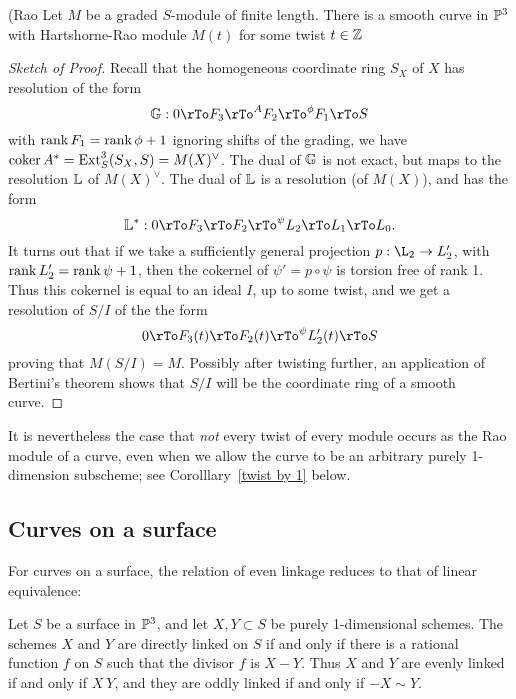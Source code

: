 \begin{theorem}(Rao\cite{***}
Let $M$ be a graded $S$-module of finite length. There is a smooth curve in $\PP^3$ with Hartshorne-Rao module $M(t)$ for some twist $t\in \ZZ$
\end{theorem}
\begin{proof}[Sketch of Proof] 
Recall that the homogeneous coordinate
ring $S_X$ of $X$ has resolution of the form
$$
\GG: 0\rTo F_3\rTo^A F_2\rTo^\phi F_1\rTo S
$$
with $\rank F_1 = \rank \phi+1$
ignoring shifts of the grading, we have $\coker A^* = \Ext^3_S(S_X,S)  = M(X)^\vee$. The dual of $\GG$ is not exact, but maps to the 
resolution $\LL$ of $M(X)^\vee$. The dual of $\LL$ is a resolution (of $M(X)$), and has the form
$$
\LL^*: 0\rTo F_3 \rTo F_2\rTo^\psi L_2\rTo L_1\rTo L_0.
$$
It turns out that if we take a sufficiently general projection $p: \L_2\to L_2'$, with $\rank L_2' = \rank \psi+1$, then
the cokernel of $\psi' = p\circ \psi$ is torsion free of rank 1. Thus this cokernel is equal to an ideal $I$, up to some twist, 
and we get a resolution of $S/I$ of the the form
$$
0\rTo F_3(t) \rTo F_2(t) \rTo^\psi L_2'(t)\rTo S
$$
proving that $M(S/I) = M$. Possibly after twisting further, an application of Bertini's theorem shows that $S/I$ will be the coordinate ring of a smooth curve.
\end{proof}

It is nevertheless the case that \emph{not} every twist of every module occurs as the Rao module of a curve, even when we allow the curve to be an arbitrary purely 1-dimension subscheme; see Corolllary~\ref{twist by 1} below.

\subsection{Curves on a surface}
For curves on a surface,
the relation of even linkage reduces to
that of linear equivalence:

\begin{proposition}
Let $S$ be a surface in $\PP^3$, and let $X,Y\subset S$ be purely 1-dimensional schemes. The schemes $X$ and $Y$ are directly linked on $S$ if and only if
there is a rational function $f$ on $S$ such that the divisor $f$ is $X-Y$. Thus $X$ and $Y$ are evenly linked if and only if 
$X~Y$, and they are oddly linked if and only if $-X\sim Y$.
\end{proposition}

